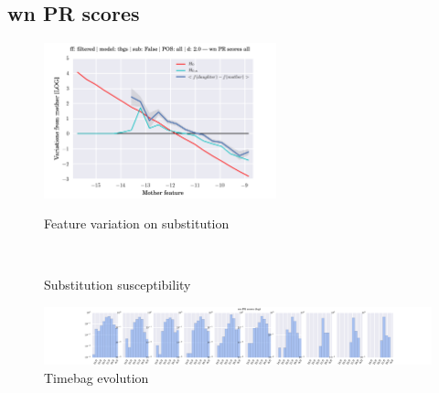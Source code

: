\subsection{wn PR scores}
\begin{figure}[h!]
    \centering
    \includegraphics[width=0.6\textwidth]{images/feature-cards/wn_PR_scores/feature_variations.png}
    \caption{Feature variation on substitution}
	~
	\caption{Substitution susceptibility}
    \includegraphics[width=\textwidth]{images/feature-cards/wn_PR_scores/timebags_evolution-hist.png}
	\caption{Timebag evolution}
\end{figure}
